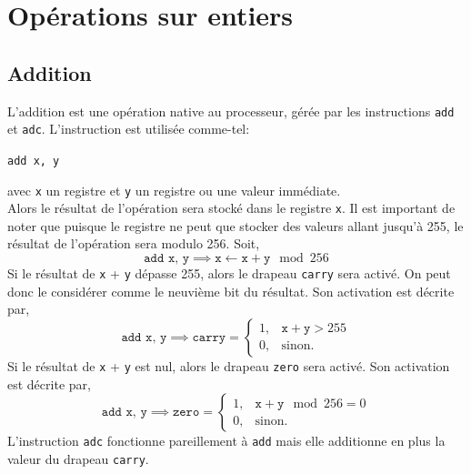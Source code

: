 \documentclass{article}
\begin{document}
\section{Opérations sur entiers}
\subsection{Addition}
L'addition est une opération native au processeur, gérée par les instructions \texttt{add} et \texttt{adc}.
L'instruction est utilisée comme-tel:\\

\begin{center}
\texttt{add x, y}
\end{center}
avec \texttt{x} un registre et \texttt{y} un registre ou une valeur immédiate.\\Alors le résultat de l'opération sera stocké dans le registre \texttt{x}. Il est important de noter que puisque le registre ne peut que stocker des valeurs allant jusqu'à 255, le résultat de l'opération sera modulo 256.
Soit, 
$$\texttt{add x, y} \implies \texttt{x} \leftarrow \texttt{x} + \texttt{y} \mod 256$$
Si le résultat de \texttt{x} + \texttt{y} dépasse 255, alors le drapeau \texttt{carry} sera activé. On peut donc le considérer comme le neuvième bit du résultat. Son activation est décrite par,
$$\texttt{add x, y} \implies \texttt{carry} = \begin{cases}
1, & \texttt{x} + \texttt{y} > 255\\
0, & \text{sinon.}
\end{cases}$$
Si le résultat de \texttt{x} + \texttt{y} est nul, alors le drapeau \texttt{zero} sera activé. Son activation est décrite par,
$$\texttt{add x, y} \implies \texttt{zero} = \begin{cases}
1, & \texttt{x} + \texttt{y}\mod 256= 0\\
0, & \text{sinon.}
\end{cases}$$
L'instruction \texttt{adc} fonctionne pareillement à \texttt{add} mais elle additionne en plus la valeur du drapeau \texttt{carry}.
\end{document}
